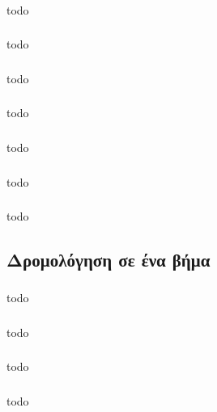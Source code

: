 \documentclass[a4paper, 12pt]{article}
\begin{document}
		\subsubsection{}
			todo

		\subsubsection{}
			todo

		\subsubsection{}
			todo

		\subsubsection{}
			todo

		\subsubsection{}
			todo

		\subsubsection{}
			todo

		\subsubsection{}
			todo

	\subsection{Δρομολόγηση σε ένα βήμα}

		\subsubsection{}
			todo

		\subsubsection{}
			todo

		\subsubsection{}
			todo

		\subsubsection{}
			todo
\end{document}
